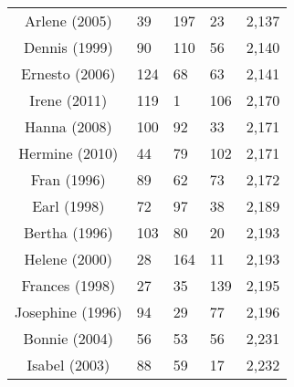 \begin{table}[ht]
\begin{tabular}{cP{3cm}P{3cm}P{3cm}P{3cm}}
  Arlene (2005) & 39 & 197 & 23 & 2,137 \\ 
  Dennis (1999) & 90 & 110 & 56 & 2,140 \\ 
  Ernesto (2006) & 124 & 68 & 63 & 2,141 \\ 
  Irene (2011) & 119 & 1 & 106 & 2,170 \\ 
  Hanna (2008) & 100 & 92 & 33 & 2,171 \\ 
  Hermine (2010) & 44 & 79 & 102 & 2,171 \\ 
  Fran (1996) & 89 & 62 & 73 & 2,172 \\ 
  Earl (1998) & 72 & 97 & 38 & 2,189 \\ 
  Bertha (1996) & 103 & 80 & 20 & 2,193 \\ 
  Helene (2000) & 28 & 164 & 11 & 2,193 \\ 
  Frances (1998) & 27 & 35 & 139 & 2,195 \\ 
  Josephine (1996) & 94 & 29 & 77 & 2,196 \\ 
  Bonnie (2004) & 56 & 53 & 56 & 2,231 \\ 
  Isabel (2003) & 88 & 59 & 17 & 2,232 \\ 
   \bottomrule
\end{tabular}
\end{table}
